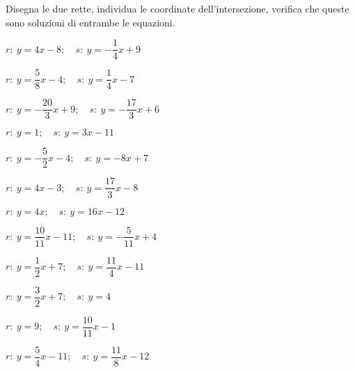 \begin{esercizio}\label{ese:}
 Disegna le due rette, individua le 
coordinate dell'intersezione, verifica che queste sono soluzioni di 
entrambe le equazioni.
 \begin{multicols}{2}
 \begin{enumeratea}
  \item  $r:~y = 4 x -8; \quad s:~y = -\dfrac{1}{4} x +9$
  \item  $r:~y = \dfrac{5}{8} x -4; \quad s:~y = \dfrac{1}{4} x -7$
  \item  $r:~y = -\dfrac{20}{3} x +9; \quad s:~y = -\dfrac{17}{3} x +6$
  \item  $r:~y = 1;\quad s:~y = 3 x -11$
  \item  $r:~y = -\dfrac{5}{2} x -4; \quad s:~y = -8 x +7$
  \item  $r:~y = 4 x -3; \quad s:~y = \dfrac{17}{3} x -8$
  \item  $r:~y = 4 x ; \quad s:~y = 16 x -12$
  \item  $r:~y = \dfrac{10}{11} x -11; \quad s:~y = -\dfrac{5}{11} x +4$
  \item  $r:~y = \dfrac{1}{2} x +7; \quad s:~y = \dfrac{11}{4} x -11$
  \item  $r:~y = \dfrac{3}{2} x +7; \quad s:~y = 4$
  \item  $r:~y = 9; \quad s:~y = \dfrac{10}{11} x -1$
  \item  $r:~y = \dfrac{5}{4} x -11; \quad s:~y = \dfrac{11}{8} x -12$
 \end{enumeratea}
 \end{multicols}
\end{esercizio}

